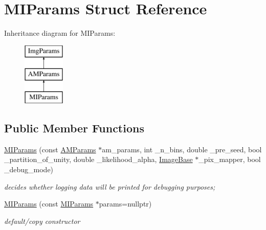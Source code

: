 \hypertarget{structMIParams}{\section{M\-I\-Params Struct Reference}
\label{structMIParams}
}
Inheritance diagram for M\-I\-Params\-:\begin{figure}[H]
\begin{center}
\leavevmode
\includegraphics[height=3.000000cm]{structMIParams}
\end{center}
\end{figure}
\subsection*{Public Member Functions}
\begin{DoxyCompactItemize}
\item 
\hyperlink{structMIParams_aacca20277bf120fca95f3641018a6556}{M\-I\-Params} (const \hyperlink{structAMParams}{A\-M\-Params} $\ast$am\-\_\-params, int \-\_\-n\-\_\-bins, double \-\_\-pre\-\_\-seed, bool \-\_\-partition\-\_\-of\-\_\-unity, double \-\_\-likelihood\-\_\-alpha, \hyperlink{classImageBase}{Image\-Base} $\ast$\-\_\-pix\-\_\-mapper, bool \-\_\-debug\-\_\-mode)
\begin{DoxyCompactList}\small\item\em decides whether logging data will be printed for debugging purposes; \end{DoxyCompactList}\item 
\hypertarget{structMIParams_a7d61e0e505a06adcc6631c70ea115735}{\hyperlink{structMIParams_a7d61e0e505a06adcc6631c70ea115735}{M\-I\-Params} (const \hyperlink{structMIParams}{M\-I\-Params} $\ast$params=nullptr)}\label{structMIParams_a7d61e0e505a06adcc6631c70ea115735}

\begin{DoxyCompactList}\small\item\em default/copy constructor \end{DoxyCompactList}\end{DoxyCompactItemize}
